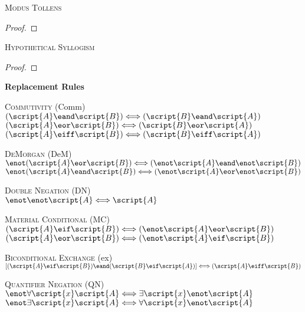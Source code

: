 \textsc{Modus Tollens}

\begin{proof}
	 
\end{proof}

\textsc{Hypothetical Syllogism}

\begin{proof}
\end{proof}



{\LARGE \bf Replacement Rules}
{
\center

\textsc{Commutivity} (Comm)\\
$(\script{A}\eand\script{B}) \Longleftrightarrow (\script{B}\eand\script{A})$\\
$(\script{A}\eor\script{B}) \Longleftrightarrow (\script{B}\eor\script{A})$\\
$(\script{A}\eiff\script{B}) \Longleftrightarrow (\script{B}\eiff\script{A})$

\textsc{DeMorgan} (DeM)\\
$\enot(\script{A}\eor\script{B}) \Longleftrightarrow (\enot\script{A}\eand\enot\script{B})$\\
$\enot(\script{A}\eand\script{B}) \Longleftrightarrow (\enot\script{A}\eor\enot\script{B})$

\textsc{Double Negation} (DN)\\
$\enot\enot\script{A} \Longleftrightarrow \script{A}$

\textsc{Material Conditional} (MC)\\
$(\script{A}\eif\script{B}) \Longleftrightarrow (\enot\script{A}\eor\script{B})$\\
$(\script{A}\eor\script{B}) \Longleftrightarrow (\enot\script{A}\eif\script{B})$

\textsc{Biconditional Exchange} ({\eiff}{ex})\\
$[(\script{A}\eif\script{B})\eand(\script{B}\eif\script{A})] \Longleftrightarrow (\script{A}\eiff\script{B})$

\textsc{Quantifier Negation} (QN)\\
$\enot\forall\script{x}\script{A} \Longleftrightarrow \exists\script{x}\enot\script{A}$\\
$\enot\exists\script{x}\script{A} \Longleftrightarrow \forall\script{x}\enot\script{A}$

}



